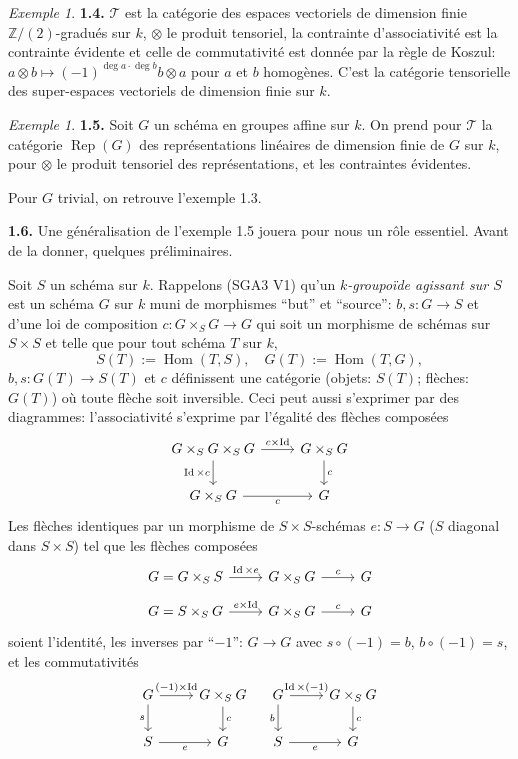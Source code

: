 \documentclass[12pt,a4paper]{article}
\theoremstyle{plain}
\theoremstyle{definition}
\theoremstyle{remark}
\newtheorem{example}[theorem]{Exemple}
\DeclareMathOperator{\Hom}{Hom}
\DeclareMathOperator{\Id}{Id}
\DeclareMathOperator{\Rep}{Rep}
\begin{document}
\begin{example}
\textbf{1.4.} $\mathcal{T}$ est la catégorie des espaces vectoriels de dimension finie $\mathbb{Z}/(2)$-gradués sur $k$, $\otimes$ le produit tensoriel, la contrainte d'associativité est la contrainte évidente et celle de commutativité est donnée par la règle de Koszul: $a \otimes b \mapsto (-1)^{\deg a \cdot \deg b} b \otimes a$ pour $a$ et $b$ homogènes. C'est la catégorie tensorielle des super-espaces vectoriels de dimension finie sur $k$.
\end{example}

\begin{example}
\textbf{1.5.} Soit $G$ un schéma en groupes affine sur $k$. On prend pour $\mathcal{T}$ la catégorie $\Rep(G)$ des représentations linéaires de dimension finie de $G$ sur $k$, pour $\otimes$ le produit tensoriel des représentations, et les contraintes évidentes.

Pour $G$ trivial, on retrouve l'exemple 1.3.
\end{example}

\textbf{1.6.} Une généralisation de l'exemple 1.5 jouera pour nous un rôle essentiel. Avant de la donner, quelques préliminaires.

Soit $S$ un schéma sur $k$. Rappelons (SGA3 V1) qu'un \emph{$k$-groupoïde agissant sur $S$} est un schéma $G$ sur $k$ muni de morphismes ``but'' et ``source'': $b,s : G \to S$ et d'une loi de composition $c : G \times_S G \to G$ qui soit un morphisme de schémas sur $S \times S$ et telle que pour tout schéma $T$ sur $k$,
\[
S(T) := \Hom(T,S), \quad G(T) := \Hom(T,G),
\]
$b,s : G(T) \to S(T)$ et $c$ définissent une catégorie (objets: $S(T)$; flèches: $G(T)$) où toute flèche soit inversible. Ceci peut aussi s'exprimer par des diagrammes: l'associativité s'exprime par l'égalité des flèches composées
\[
\begin{tikzcd}
G \times_S G \times_S G \arrow[r, "c \times \Id"] \arrow[d, "\Id \times c"'] & G \times_S G \arrow[d, "c"] \\
G \times_S G \arrow[r, "c"'] & G
\end{tikzcd}
\]
Les flèches identiques par un morphisme de $S \times S$-schémas $e : S \to G$ ($S$ diagonal dans $S \times S$) tel que les flèches composées
\[
\begin{tikzcd}
G = G \times_S S \arrow[r, "\Id \times e"] & G \times_S G \arrow[r, "c"] & G
\end{tikzcd}
\]
\[
\begin{tikzcd}
G = S \times_S G \arrow[r, "e \times \Id"] & G \times_S G \arrow[r, "c"] & G
\end{tikzcd}
\]
soient l'identité, les inverses par ``$-1$'': $G \to G$ avec $s \circ (-1) = b$, $b \circ (-1) = s$, et les commutativités
\[
\begin{tikzcd}
G \arrow[r, "(-1) \times \Id"] \arrow[d, "s"'] & G \times_S G \arrow[d, "c"] \\
S \arrow[r, "e"'] & G
\end{tikzcd}
\quad
\begin{tikzcd}
G \arrow[r, "\Id \times (-1)"] \arrow[d, "b"'] & G \times_S G \arrow[d, "c"] \\
S \arrow[r, "e"'] & G
\end{tikzcd}
\]
\end{document}
